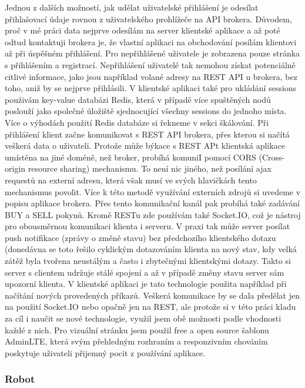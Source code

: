 \documentclass[thesis=M,czech]{FITthesis}[2012/06/26]
\begin{document}
    Jednou z dalších možností, jak udělat uživatelské přihlášení je odesílat přihlašovací údaje rovnou z uživatelského prohlížeče na API brokera. Důvodem, proč v mé práci data nejprve odesílám na server klientské aplikace a až poté odtud kontaktuji brokera je, že vlastní aplikaci na obchodování posílám klientovi až při úspěšném přihlášení. Pro nepřihlášené uživatele je zobrazena pouze stránka s přihlášením a registrací. Nepřihlášení uživatelé tak nemohou získat potenciálně citlivé informace, jako jsou například volané adresy na REST API u brokera, bez toho, aniž by se nejprve přihlásili. 
    V klientské aplikaci také pro ukládání sessions použivám key-value databázi Redis, která v případě více spuštěných nodů poslouží jako společné úložiště sjednocující všechny sessions do jednoho místa. Více o výhodách použití Redis databáze si řekneme v sekci škálování.
    Při přihlášení klient začne komunikovat s REST API brokera, přes kterou si načítá veškerá data o uživateli. Protože může býkace s REST APt klientská aplikace umístěna na jiné doméně, než broker, probíhá komuniI pomocí CORS (Cross-origin resource sharing) mechanismu. To není nic jiného, než posílání ajax requestů na externí adresu, která však musí ve svých hlavičkách tento mechanismus povolit. Více k této metodě využívání externích zdrojů si uvedeme v popisu aplikace brokera. Přes tento komunikační kanál pak probíhá také zadávání BUY a SELL pokynů. Kromě RESTu zde používám také Socket.IO, což je nástroj pro obousměrnou komunikaci klienta i serveru. V praxi tak může server posílat push notifikace (zprávy o změně stavu) bez předchozího klientského dotazu (donedávna se toto řešilo cyklickým dotazováním klienta na nový stav, kdy velká zátěž byla tvořena neustálým a často i zbytečnými klientskými dotazy. Takto si server s clientem udržuje stálé spojení a až v případě změny stavu server sám upozorní klienta. V klientské aplikaci je tato technologie použita například při načítání nových provedených příkazů. Veškerá komunikace by se dala předělat jen na použití Socket.IO nebo opačně jen na REST, ale protože si v této práci kladu za cíl i naučit se nové technologie, využil jsem obě možnosti podle vhodnosti každé z nich.
    Pro vizuální stránku jsem použil free a open source šablonu AdminLTE, která svým přehledným rozhraním a responzivním chováním poskytuje uživateli přijemný pocit z používání aplikace.


\subsubsection{Robot}
\end{document}
